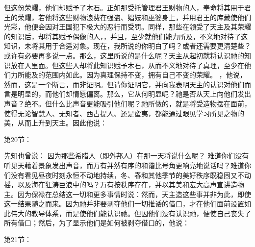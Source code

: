  \par

但这份荣耀，他们却赋予了木石。正如那受托管理君王财物的人，奉命将其用于君王的荣耀，若他将这些财物浪费在强盗、娼妓和巫婆身上，并用君王的库藏使他们光彩，他便会因对王国犯下极大的恶行而受罚。同样，那些在领受了天主及其荣耀的知识后，却将其赋予偶像的人，，并且，至少就他们能力所及，不义地对待了这知识，未将其用于合适对象。现在，我所说的你明白了吗？或者还需要更清楚些？或许有必要再多说一点。那么，这里所说的是什么呢？天主从起初就将认识祂的知识放在人里面。但这些人却将此知识赋予木石，从而不义地对待了真理，至少在他们力所能及的范围内如此。因为真理保持不变，拥有自己不变的荣耀。 ，他说，然而，这是一个断言，而非证明。但请你证明它，并向我表明天主的认识对他们而言是明显的，而他们却情愿偏离。那么，它从何明显呢？祂是否从天上向他们发出声音？绝不。但什么比声音更能吸引他们呢？祂所做的，就是将受造物摆在面前，使得无论智慧人、无知者、西古提人、还是蛮夷，都能通过眼见学习所见之物的美，从而上升到天主。因此他说：\par

第20节：\par

先知也曾说： 因为那些希腊人（即外邦人）在那一天将说什么呢？ 难道你们没有听见天藉着景象发出声音，而万有并然有序的和谐比号角更响亮地说话吗？难道你们没有看见昼夜时刻永恒不动地持续，冬、春和其他季节的美好秩序既稳固又不动摇，以及海在狂涛巨浪中的吗？万有按秩序存在，并以其美和宏大高声宣讲造物主。因为保禄在总结这一切和更多事情时说：然而，天主造这些事并非为此，即使这一结果随之而来。因为祂并非要剥夺他们一切推诿的借口，才在他们面前设置如此伟大的教导体系，而是使他们能认识祂。但因他们没有认识祂，便使自己丧失了所有借口；然后，为了显示他们是如何被剥夺借口的，他说：\par

第21节：\par

